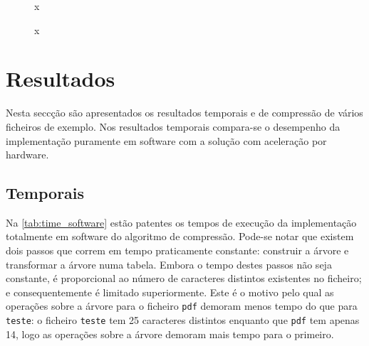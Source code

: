 \documentclass[a4paper]{article}
\begin{document}
	\begin{figure}[H]
		\centering
		\caption{x}
		\label{fig:hw_datapath}
	\end{figure}


	\begin{figure}[H]
		\centering
		\caption{x}
		\label{fig:hw_fsm}
	\end{figure}



	\section{Resultados}
	\label{sec:results}

	Nesta seccção são apresentados os resultados temporais e de compressão de vários ficheiros de exemplo. Nos resultados temporais compara-se o desempenho da implementação puramente em software com a solução com aceleração por hardware.

	\subsection{Temporais}

	Na \autoref{tab:time_software} estão patentes os tempos de execução da implementação totalmente em software do algoritmo de compressão. Pode-se notar que existem dois passos que correm em tempo praticamente constante: construir a árvore e transformar a árvore numa tabela. Embora o tempo destes passos não seja constante, é proporcional ao número de caracteres distintos existentes no ficheiro; e consequentemente é limitado superiormente. Este é o motivo pelo qual as operações sobre a árvore para o ficheiro \texttt{pdf} demoram menos tempo do que para \texttt{teste}: o ficheiro \texttt{teste} tem 25 caracteres distintos enquanto que \texttt{pdf} tem apenas 14, logo as operações sobre a árvore demoram mais tempo para o primeiro.
\end{document}
